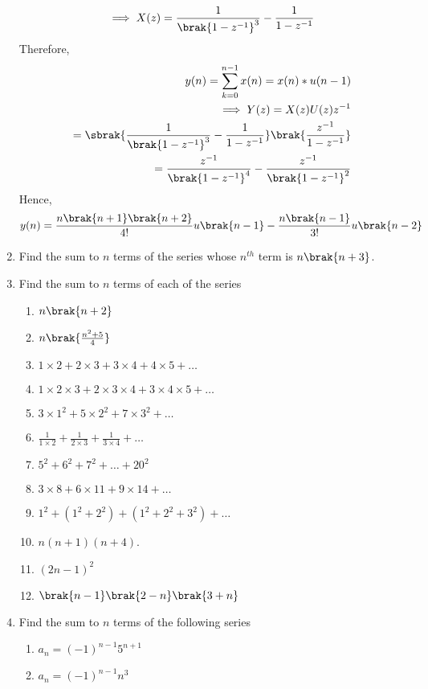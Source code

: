 \begin{enumerate}[label=\thesubsection.\arabic*,ref=\thesubsection.\theenumi]
\begin{align}
	  \implies X(z) = \frac{1}{\brak{1-z^{-1}}^3}-\frac{1}{1-z^{-1}}
	  \end{align}
		Therefore,
		\begin{align}
		y(n) = \sum_{k=0}^{n-1}x(n) = x(n)*u(n-1)
		\\
		\implies Y(z) = X(z)U(z)z^{-1}
		\\
		=\sbrak{\frac{1}{\brak{1-z^{-1}}^3}-\frac{1}{1-z^{-1}}}\brak{\frac{z^{-1}}{1-z^{-1}}}
		\\
		=\frac{z^{-1}}{\brak{1-z^{-1}}^4}-\frac{z^{-1}}{\brak{1-z^{-1}}^2}
		\end{align}
		Hence,
		\begin{align}
          y(n)=\frac{n\brak{n+1}\brak{n+2}}{4!}u\brak{n-1} 
          -\frac{n\brak{n-1}}{3!}u\brak{n-2} 
		\end{align}
	\item Find the sum to $n$ terms of the series whose $n^{th}$ term is $n\brak{n+3}$.
\item Find the sum to $n$ terms of each of the series
	\begin{multicols}{2}
		\begin{enumerate}[itemsep=1ex]
			\item $n\brak{n+2}$
			\item $n\brak{\frac{n^2+5}{4}}$
\item $1 \times 2 + 2 \times 3 + 3 \times 4 + 4 \times 5 +\dots $
\item $1 \times 2 \times 3 + 2 \times 3 \times 4 + 3 \times 4 \times 5 + \dots $
\item $3 \times 1^2 + 5 \times 2^2 + 7 \times 3^2 + \dots $
\item $\frac{1}{1 \times 2}+\frac{1}{2\times3}+\frac{1}{3\times4}+\dots $
\item $5^2 + 6^2 + 7^2 + \dots  + 20^2$
\item $3 \times 8 + 6 \times 11 + 9 \times 14 + \dots $
\item $1^2 + (1^2 + 2^2 ) + (1^2 + 2^2 + 3^2 ) + \dots $
\item $n (n+1) (n+4)$.
\item $(2 n - 1)^2$
\item $\brak{n-1}\brak{2-n}\brak{3+n}$
\end{enumerate}
\end{multicols}
\item Find the sum to $n$ terms of the following series
\begin{enumerate}
\item $a_n = (-1)^{n-1}5^{n+1}$
\item $a_n = (-1)^{n-1}n^3$

\end{enumerate}
\end{enumerate}

